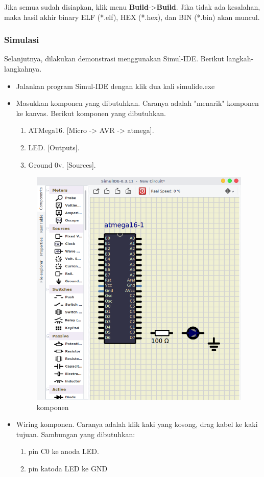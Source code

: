 \documentclass[12pt,]{article}
\begin{document}
	Jika semua sudah disiapkan, klik menu \textbf{Build}->\textbf{Build}.
	Jika tidak ada kesalahan, maka hasil akhir binary ELF (*.elf), HEX (*.hex), dan BIN (*.bin) akan muncul.
	
	\subsubsection{Simulasi}
	
	Selanjutnya, dilakukan demonstrasi menggunakan Simul-IDE.
	Berikut langkah-langkahnya.
	\begin{itemize}
		\item Jalankan program Simul-IDE dengan klik dua kali simulide.exe
		
		\item Masukkan komponen yang dibutuhkan.
		Caranya adalah "menarik" komponen ke kanvas.
		Berikut komponen yang dibutuhkan.
		\begin{enumerate}
			\item ATMega16. [Micro -> AVR -> atmega].
			\item LED. [Outputs].
			\item Ground 0v. [Sources].
		\end{enumerate}
	
		\begin{figure}[H]
			\centering
			\includegraphics[width=0.5\linewidth]{images/tessim_0}
			\caption{komponen}
		\end{figure}
	
		\item Wiring komponen.
		Caranya adalah klik kaki yang kosong, drag kabel ke kaki tujuan.
		Sambungan yang dibutuhkan:
		\begin{enumerate}
			\item pin C0 ke anoda LED.
			\item pin katoda LED ke GND
		\end{enumerate}
	

\end{itemize}
\end{document}
